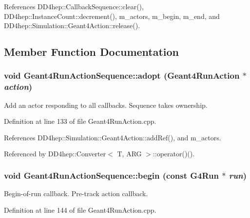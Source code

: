 References DD4hep::CallbackSequence::clear(), DD4hep::InstanceCount::decrement(), m\_\-actors, m\_\-begin, m\_\-end, and DD4hep::Simulation::Geant4Action::release().

\subsection{Member Function Documentation}
\hypertarget{class_d_d4hep_1_1_simulation_1_1_geant4_run_action_sequence_a9daef9eac6020138426b08116710ceaf}{
\subsubsection[{adopt}]{\setlength{\rightskip}{0pt plus 5cm}void Geant4RunActionSequence::adopt ({\bf Geant4RunAction} $\ast$ {\em action})}}
\label{class_d_d4hep_1_1_simulation_1_1_geant4_run_action_sequence_a9daef9eac6020138426b08116710ceaf}


Add an actor responding to all callbacks. Sequence takes ownership. 

Definition at line 133 of file Geant4RunAction.cpp.

References DD4hep::Simulation::Geant4Action::addRef(), and m\_\-actors.

Referenced by DD4hep::Converter$<$ T, ARG $>$::operator()().\hypertarget{class_d_d4hep_1_1_simulation_1_1_geant4_run_action_sequence_a447a8f86614e2a958dcc0761ce89344b}{
\subsubsection[{begin}]{\setlength{\rightskip}{0pt plus 5cm}void Geant4RunActionSequence::begin (const G4Run $\ast$ {\em run})}}
\label{class_d_d4hep_1_1_simulation_1_1_geant4_run_action_sequence_a447a8f86614e2a958dcc0761ce89344b}


Begin-\/of-\/run callback. Pre-\/track action callback. 

Definition at line 144 of file Geant4RunAction.cpp.

